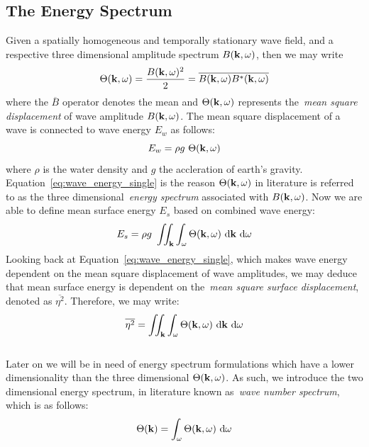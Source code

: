 \subsection{The Energy Spectrum}
\label{sec:energy_spectrum}
Given a spatially homogeneous and temporally stationary wave field, and a
respective three dimensional amplitude spectrum $B(\mathbf{k},\omega)$, then we
may write
\begin{equation}
\label{eq:energy_spectrum_3d}
 \Theta(\mathbf{k}, \omega) = \frac{B(\mathbf{k}, \omega)^2}{2} = 
\overline{B(\mathbf{k}, \omega)B^{*}(\mathbf{k}, \omega)}
\end{equation}
where the $\overline{B}$ operator denotes the mean and
$\Theta(\mathbf{k},\omega)$ represents the~\emph{mean square displacement} of
wave amplitude $B(\mathbf{k},\omega)$. The mean square displacement of a wave
is connected to wave energy $E_w$ as follows:
%
\begin{equation}
\label{eq:wave_energy_single}
 E_w = \rho g~\Theta(\mathbf{k},\omega)
\end{equation}
%
where $\rho$ is the water density and $g$ the accleration of earth's gravity.
Equation~\ref{eq:wave_energy_single} is the reason $\Theta(\mathbf{k},\omega)$
in literature is referred to as the three dimensional~\emph{energy spectrum}
associated with $B(\mathbf{k},\omega)$. Now we are able to define mean surface
energy $E_s$ based on combined wave energy:
%
\begin{equation}
\label{eq:wave_energy_3d}
 E_s = \rho g~\iint_{\mathbf{k}}\int_{\omega}\Theta(\mathbf{k},\omega)
~\mathrm{d}\mathbf{k}~\mathrm{ d}\omega
\end{equation}
%
Looking back at Equation~\ref{eq:wave_energy_single}, which makes wave energy
dependent on the mean square displacement of wave amplitudes, we may deduce that
mean surface energy is dependent on the~\emph{mean square surface displacement},
denoted as $\overline{\eta^2}$. Therefore, we may write:
%
\begin{equation}
\label{eq:mean_square_eta}
\overline{\eta^2} = \iint_{\mathbf{k}}\int_{\omega}\Theta(\mathbf{k},\omega)
~\mathrm{d}\mathbf{k}~\mathrm{d}\omega
\end{equation}
%
\\
Later on we will be in need of energy spectrum formulations which have a lower
dimensionality than the three dimensional $\Theta(\mathbf{k},\omega)$. As such,
we introduce the two dimensional energy spectrum, in literature known
as~\emph{wave number spectrum}, which is as follows:
\begin{equation}
\label{eq:energy_spectrum_2d}
 \Theta(\mathbf{k}) = \int_{\omega} \Theta(\mathbf{k}, \omega)~\mathrm{d}\omega
\end{equation}
